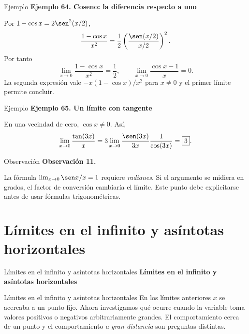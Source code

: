 \documentclass[12pt,aspectratio=169]{beamer}
\begin{document}
\begin{frame}[t,allowframebreaks]{Ejemplo}
{\color{azul}\bfseries Ejemplo 64. Coseno: la diferencia respecto a uno}\par\medskip

Por $1-\cos x=2\sen^2(x/2)$,
\[
 \frac{1-\cos x}{x^2}
 =\frac12\left(\frac{\sen(x/2)}{x/2}\right)^2.
\]
Por tanto
\[
 \boxed{\lim_{x\to0}\frac{1-\cos x}{x^2}=\frac12},\qquad
 \boxed{\lim_{x\to0}\frac{\cos x-1}{x}=0}.
\]
La segunda expresión vale $-x(1-\cos x)/x^2$ para $x\ne0$ y el primer límite permite concluir.
\end{frame}


\begin{frame}[t,allowframebreaks]{Ejemplo}
{\color{azul}\bfseries Ejemplo 65. Un límite con tangente}\par\medskip

En una vecindad de cero, $\cos x\ne0$. Así,
\[
 \lim_{x\to0}\frac{\tan(3x)}x
 =3\lim_{x\to0}\frac{\sen(3x)}{3x}\frac1{\cos(3x)}=\boxed3.
\]
\end{frame}


\begin{frame}[t,allowframebreaks]{Observación}
{\color{azul}\bfseries Observación 11.}\par\medskip

La fórmula $\lim_{x\to0}\sen x/x=1$ requiere \emph{radianes}. Si el argumento se midiera en grados, el factor de conversión cambiaría el límite. Este punto debe explicitarse antes de usar fórmulas trigonométricas.
\end{frame}


\section{Límites en el infinito y asíntotas horizontales}

\begin{frame}[t]{Límites en el infinito y asíntotas horizontales}
\centering\vfill{\Large\bfseries\color{azul} Límites en el infinito y asíntotas horizontales}\vfill
\end{frame}


\begin{frame}[t,allowframebreaks]{Límites en el infinito y asíntotas horizontales}
En los límites anteriores $x$ se acercaba a un punto fijo. Ahora investigamos qué ocurre cuando la variable toma valores positivos o negativos arbitrariamente grandes. El comportamiento cerca de un punto y el comportamiento \emph{a gran distancia} son preguntas distintas.
\end{frame}
\end{document}
